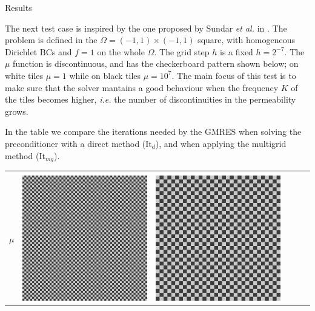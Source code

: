 \documentclass[final]{beamer}
\newlength{\onecolwid}
\begin{document}
\begin{frame}[t]
\begin{columns}[t]
\begin{column}{\onecolwid}
\begin{block}{Results}
\null

The next test case is inspired by the one proposed by Sundar \textit{et al.} in \cite{burstedde2012}.
The problem is defined in the {$\Omega = (-1, 1) \times (-1, 1)$} square,
with homogeneous Dirichlet BCs and $f = 1$ on the whole $\Omega$.
The grid step $h$ is a fixed $h = 2^{-7}$.
The $\mu$ function is discontinuous, and has the checkerboard pattern shown below;
on white tiles $\mu = 1$ while on black tiles $\mu = 10^{7}$.
The main focus of this test is to make sure that the solver mantains a good behaviour when the frequency $K$
of the tiles
becomes higher, \textit{i.e.} the number of discontinuities in the permeability grows.

In the table we compare the iterations needed by the GMRES when solving the preconditioner with a
direct method (It$_d$), and when applying the multigrid method (It$_{mg}$).
\begin{table}
\small
\begin{center}
    \begin{tabular}{cccccc}
        \toprule
        & & & & &\\[-2ex] %
        $\mu$  &
    \includegraphics[scale=0.5]{images/burst_6.png}
        &
    \includegraphics[scale=0.5]{images/burst_5.png}

\end{tabular}
\end{center}
\end{table}
\end{block}
\end{column}
\end{columns}
\end{frame}
\end{document}
